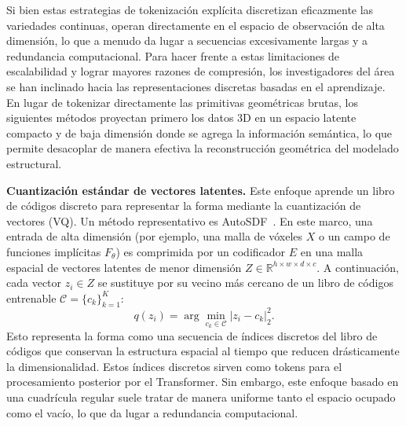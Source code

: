 \documentclass[../../book-main_es.tex]{subfiles}
\begin{document}
Si bien estas estrategias de tokenización explícita discretizan eficazmente
las variedades continuas, operan directamente en el espacio de observación de alta dimensión,
lo que a menudo da lugar a secuencias excesivamente largas
y a redundancia computacional. Para hacer frente a estas limitaciones de escalabilidad
y lograr mayores razones de compresión, los investigadores del área se han inclinado hacia
las representaciones discretas basadas en el aprendizaje. En lugar de tokenizar directamente las primitivas geométricas brutas,
los siguientes métodos proyectan primero los datos 3D
en un espacio latente compacto y de baja dimensión donde se agrega la información semántica,
lo que permite desacoplar de manera efectiva la reconstrucción geométrica del modelado estructural.

\textbf{Cuantización estándar de vectores latentes.} Este enfoque aprende un
libro de códigos discreto para representar la forma mediante la cuantización de vectores (VQ). 
Un método representativo es  AutoSDF~\cite {mittal2022autosdf}. En este marco, una entrada de alta dimensión
(por ejemplo, una malla de vóxeles $X$ o un campo de funciones implícitas $F_\theta$)
es comprimida por un codificador $E$ en una
malla espacial de vectores latentes de menor dimensión $Z \in \mathbb{R}^{h \times w \times d \times c}$. 
A continuación, cada vector $z_i \in Z$ se sustituye por su vecino más cercano de un libro de códigos 
entrenable $\mathcal{C}=\{c_k\}_{k=1}^K$:
\begin{equation}
q(z_i) = \arg\min_{c_k \in \mathcal{C}} | z_i - c_k |_2^2.
\end{equation}
Esto representa la forma como una secuencia de índices discretos del libro de códigos que conservan
la estructura espacial al tiempo que reducen drásticamente la dimensionalidad. Estos índices discretos
sirven como tokens para el procesamiento posterior por el Transformer. Sin embargo, este enfoque basado 
en una cuadrícula regular suele tratar de manera uniforme tanto el espacio ocupado como el vacío, lo 
que da lugar a redundancia computacional.

\end{document}
